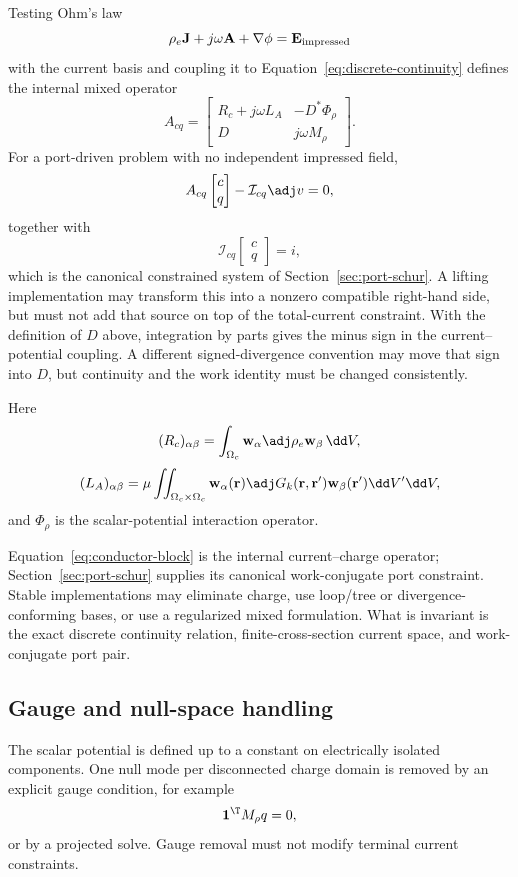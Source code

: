 Testing Ohm's law
\[
 \rho_e\mathbf J
 +j\omega\mathbf A
 +\nabla\phi
 =\mathbf E_{\rm impressed}
\]
with the current basis and coupling it to
Equation~\eqref{eq:discrete-continuity} defines the internal mixed operator
\[
 A_{cq}
 =
 \begin{bmatrix}
   R_c+j\omega L_A & -D^\ast \Phi_\rho\\
   D                & j\omega M_\rho
 \end{bmatrix}.
 \label{eq:conductor-block}
\]
For a port-driven problem with no independent impressed field,
\[
  A_{cq}
  \begin{bmatrix}
    c\\q
  \end{bmatrix}
  -
  \mathcal I_{cq}\adj v
  =0,
\]
together with
\[
  \mathcal I_{cq}
  \begin{bmatrix}
    c\\q
  \end{bmatrix}
  =i,
\]
which is the canonical constrained system of
Section~\ref{sec:port-schur}. A lifting implementation may transform this into
a nonzero compatible right-hand side, but must not add that source on top of
the total-current constraint.
With the definition of $D$ above, integration by parts gives the minus
sign in the current--potential coupling. A different signed-divergence
convention may move that sign into $D$, but continuity and the work identity
must be changed consistently.

Here
\[
 (R_c)_{\alpha\beta}
 =
 \int_{\Omega_c}
 \mathbf w_\alpha\adj\rho_e\mathbf w_\beta\,\dd V,
\]
\[
 (L_A)_{\alpha\beta}
 =
 \mu\iint_{\Omega_c\times\Omega_c}
 \mathbf w_\alpha(\mathbf r)\adj
 G_k(\mathbf r,\mathbf r')
 \mathbf w_\beta(\mathbf r')
 \dd V'\dd V,
\]
and $\Phi_\rho$ is the scalar-potential interaction operator.

Equation~\eqref{eq:conductor-block} is the internal current--charge operator;
Section~\ref{sec:port-schur} supplies its canonical work-conjugate port
constraint. Stable implementations may
eliminate charge, use loop/tree or divergence-conforming bases, or use a
regularized mixed formulation. What is invariant is the exact discrete
continuity relation, finite-cross-section current space, and work-conjugate port
pair.

\subsection{Gauge and null-space handling}

The scalar potential is defined up to a constant on electrically isolated
components. One null mode per disconnected charge domain is removed by an
explicit gauge condition, for example
\[
  \mathbf 1^\T M_\rho q=0,
\]
or by a projected solve. Gauge removal must not modify terminal current
constraints.

